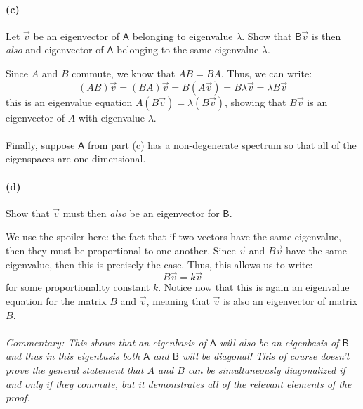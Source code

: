 \documentclass{article}
\begin{document}
\paragraph{(c)}
Let $\vec{v}$ be an eigenvector of $\mathsf{A}$ belonging to eigenvalue $\lambda$.  Show that $\mathsf{B}\vec{v}$ is then \emph{also} and eigenvector of 
$\mathsf{A}$ belonging to the same eigenvalue $\lambda$.  

\begin{solution}
	Since $A$ and $B$ commute, we know that $AB = BA$. Thus, we can write:
	\[
		(AB)\vec v = (BA)\vec v  = B(A \vec v) = B \lambda \vec v = \lambda B\vec v
	\] 	
	this is an eigenvalue equation $A(B \vec v ) = \lambda (B \vec v)$, showing that $B \vec v$ is an 
	eigenvector of $A$ with eigenvalue $\lambda$.
\end{solution}

\phline
\paragraph{}
Finally, suppose $\mathsf{A}$ from part (c) has a non-degenerate spectrum so that all of the eigenspaces are one-dimensional.


\paragraph{(d)}
Show that $\vec{v}$ must then \emph{also} be an eigenvector for $\mathsf{B}$.


\begin{solution}
	We use the spoiler here: the fact that if two vectors have the same eigenvalue, then they must be 
	proportional to one another. Since $\vec v$ and $B\vec v$ have the same eigenvalue, then this is precisely
	the case. Thus, this allows us to write:
	\[
	B\vec v = k \vec v
	\] 
	for some proportionality constant $k$. Notice now that this is again an eigenvalue equation for the matrix 
	$B$ and $\vec v$, meaning that $\vec v$ is also an eigenvector
	of matrix $B$.
\end{solution}

\paragraph{}
\noindent\emph{Commentary: This shows that an eigenbasis of $\mathsf{A}$ will \emph{also} be an eigenbasis of $\mathsf{B}$ and thus in this eigenbasis both 
$\mathsf{A}$ and $\mathsf{B}$ will be diagonal!  This of course doesn't prove the general statement that $A$ and $B$ can be simultaneously diagonalized if and only 
if they commute, but it demonstrates all of the relevant elements of the proof.}
\end{document}
